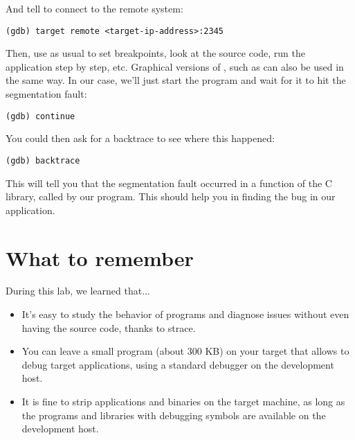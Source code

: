 And tell  to connect to the remote system:
\begin{verbatim}
(gdb) target remote <target-ip-address>:2345
\end{verbatim}

Then, use  as usual to set breakpoints, look at the source
code, run the application step by step, etc. Graphical versions of
, such as  can also be used in the same way.
In our case, we'll just start the program and wait for it to hit
the segmentation fault:
\begin{verbatim}
(gdb) continue
\end{verbatim}

You could then ask for a backtrace to see where this happened:
\begin{verbatim}
(gdb) backtrace
\end{verbatim}

This will tell you that the segmentation fault occurred in a function
of the C library, called by our program. This should help you in
finding the bug in our application.

\section{What to remember}

During this lab, we learned that...
\begin{itemize}

\item It's easy to study the behavior of programs and diagnose issues
  without even having the source code, thanks to strace.

\item You can leave a small  program (about 300 KB) on your target
  that allows to debug target applications, using a standard 
  debugger on the development host.

\item It is fine to strip applications and binaries on the target
  machine, as long as the programs and libraries with debugging
  symbols are available on the development host.

\end{itemize}
